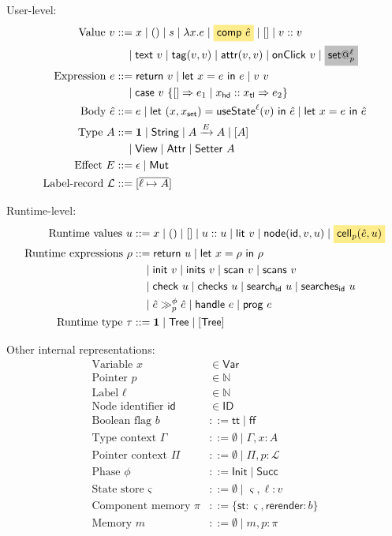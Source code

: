 \documentclass{article}
\makeatletter
\newcommand{\num}[1]{\overline{#1}}
\newcommand{\mf}[1]{\mathsf{#1}}
\newcommand{\mc}[1]{\mathcal{#1}}
\newcommand{\mb}[1]{\mathbf{#1}}
\newcommand{\mhl}[1]{\colorbox{LightGoldenrod1}{$#1$}}
\newcommand{\mgrey}[1]{\colorbox{lightgray}{$#1$}}
\newcommand{\map}[2]{[\num{#1 \mapsto #2}]}
\newcommand{\arrow}[1]{\xrightarrow{#1}}
\newcommand{\ptp}{A}
\newcommand{\rtp}{\tau}
\newcommand{\tone}{\mb{1}}
\newcommand{\tstr}{\mf{String}}
\newcommand{\tview}{\mf{View}}
\newcommand{\tattr}{\mf{Attr}}
\newcommand{\tset}[1]{\mf{Setter}\ #1}
\newcommand{\emut}{\mf{Mut}}
\newcommand{\ttree}{\mf{Tree}}
\renewcommand{\tt}{\mf{tt}}
\newcommand{\ff}{\mf{ff}}
\newcommand{\vtxt}[1]{\mf{text}\ #1}
\newcommand{\vtag}[2]{\mf{tag}(#1, #2)}
\newcommand{\vattr}[2]{\mf{attr}(#1, #2)}
\newcommand{\vclick}[1]{\mf{onClick}\ #1}
\newcommand{\vset}[2]{\mf{set}@^{#1}_{#2}}
\newcommand{\Ell}{\mc{L}}
\newcommand{\elet}[3]{\mf{let}\ #1 = #2\ \mf{in}\ #3}
\newcommand{\eret}[1]{\mf{return}\ #1}
\newcommand{\ecase}[5]{\mf{case}\ #1\ \{#2 \Rightarrow #3 \mid #4 \Rightarrow #5\}}
\newcommand{\estate}[4]{\mf{let}\ (#1, #1_{\mf{set}}) = \mf{useState}^{#2}(#3)\ \mf{in}\ #4}
\newcommand{\elit}[1]{\mf{lit}\ #1}
\newcommand{\enode}[3]{\mf{node}(\mf{#1}, #2, #3)}
\newcommand{\esearch}[2]{\mf{search}_\mf{#1}\ #2}
\newcommand{\esearches}[2]{\mf{searches}_\mf{#1}\ #2}
\newcommand{\ehdl}[1]{\mf{handle}\ #1}
\newcommand{\eprog}[1]{\mf{prog}\ #1}
\newcommand{\einit}[1]{\mf{init}\ #1}
\newcommand{\einits}[1]{\mf{inits}\ #1}
\newcommand{\escan}[1]{\mf{scan}\ #1}
\newcommand{\escans}[1]{\mf{scans}\ #1}
\newcommand{\echk}[1]{\mf{check}\ #1}
\newcommand{\echks}[1]{\mf{checks}\ #1}
\makeatother
\begin{document}
User-level:
\begin{align*}
\text{Value } v &::= x \mid () \mid s 
\mid \lambda x.e \mid \mhl{\mf{comp}\ \hat{e}}
\mid [] \mid v :: v\\
&\quad\mid \vtxt{v} \mid \vtag{v}{v}
\mid \vattr{v}{v} \mid \vclick{v} \mid \mgrey{\vset{\ell}{p}}\\
\text{Expression } e &::= \eret{v} \mid \elet{x}{e}{e} \mid v\ v \\
&\quad\mid \ecase{v}{[]}{e_1}{x_\mf{hd} :: x_\mf{tl}}{e_2}\\
\text{Body }\hat{e} &::= e \mid \estate{x}{\ell}{v}{\hat{e}} \mid \elet{x}{e}{\hat{e}}\\
\text{Type } \ptp &::= \tone \mid \tstr \mid \ptp \arrow{E} \ptp
\mid [\ptp] \\
&\quad\mid \tview \mid \tattr \mid \tset{\ptp}\\
\text{Effect } E &::= \epsilon \mid \emut\\
\text{Label-record }\Ell &::= \map{\ell}{\ptp}
\end{align*}

Runtime-level:
\begin{align*}
\text{Runtime values } u
&::= x \mid () \mid [] \mid u :: u
\mid \elit{v} \mid \enode{id}{v}{u}
\mid \mhl{\mf{cell}_p(\hat{e}, u)}\\
\text{Runtime expressions } \rho
&::= \eret{u} \mid \elet{x}{\rho}{\rho}\\
&\quad\mid \einit{v} \mid \einits{v} \mid \escan{v} \mid \escans{v}\\
&\quad\mid \echk{u} \mid \echks{u}
\mid \esearch{id}{u} \mid \esearches{id}{u}\\
&\quad\mid \hat{e} \gg^\phi_p \hat{e}
\mid \ehdl{e} \mid \eprog{e}\\
\text{Runtime type } \rtp &::= \tone \mid \ttree \mid [\ttree]
\end{align*}

Other internal representations:
\begin{align*}
\text{Variable }x &\in \mf{Var}\\
\text{Pointer }p &\in \mathbb{N}\\
\text{Label }\ell &\in \mathbb{N}\\
\text{Node identifier }\mf{id} &\in \mf{ID}\\
\text{Boolean flag }b &::= \tt \mid \ff\\
\text{Type context }\Gamma &::= \emptyset \mid \Gamma, x: A\\
\text{Pointer context }\Pi &::= \emptyset \mid \Pi, p: \Ell\\
\text{Phase }\phi &::= \mf{Init} \mid \mf{Succ}\\
\text{State store }\varsigma &::= \emptyset \mid \varsigma, \ell: v\\
\text{Component memory }\pi &::= \{\mf{st}: \varsigma, \mf{rerender}: b\}\\
\text{Memory }m &::= \emptyset \mid m, p: \pi\\
\end{align*}
\end{document}
